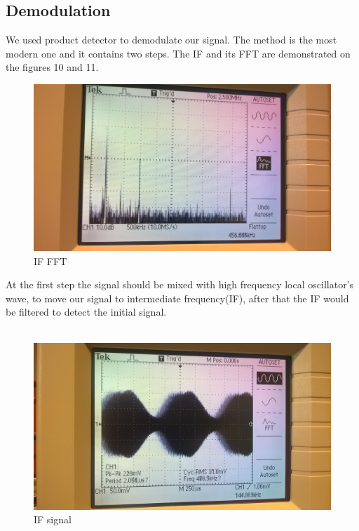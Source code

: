 \documentclass[english]{article}
\begin{document}
\subsection{Demodulation}
We used product detector to demodulate our signal. The method is the most modern one and it contains two steps.
The IF and its FFT are demonstrated on the figures 10 and 11.
\begin{figure}[H]
\centerline{\includegraphics[scale=0.09]{AM/8_IF1}}
\caption{IF FFT}
\end{figure}
At the first step the signal should be mixed with high frequency local oscillator's wave, to move our signal to intermediate frequency(IF), after that the IF would be filtered to detect the initial signal. \\\\

\begin{figure}[H]
\centerline{\includegraphics[scale=0.1]{AM/9_IF2}}
\caption{IF signal}
\end{figure}
\end{document}
